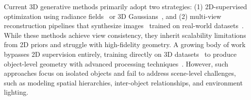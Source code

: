 
Current 3D generative methods primarily adopt two strategies: (1) 2D-supervised optimization using radiance fields~\cite{poole2022dreamfusion,hong2023lrm} or 3D Gaussians~\cite{tang2023dreamgaussian,tang2025lgm}, and (2) multi-view reconstruction pipelines that synthesize images~\cite{liu2023syncdreamer,liu2023zero,liu2024one,gao2024cat3d,voleti2025sv3d,wu2024reconfusion,long2024wonder3d} trained on real-world datasets~\cite{lebegue2020co3d, yu2023mvimgnet}. While these methods achieve view consistency, they inherit scalability limitations from 2D priors and struggle with high-fidelity geometry.
%
A growing body of work bypasses 2D supervision entirely, training directly on 3D datasets~\cite{deitke2023objaverse,deitke2024objaverse} to produce object-level geometry with advanced processing techniques~\cite{zhang20233dshape2vecset, zhang2024clay, xiang2024structured,wu2024unique3d,wang2024prolificdreamer}. However, such approaches focus on isolated objects and fail to address scene-level challenges, such as modeling spatial hierarchies, inter-object relationships, and environment lighting.

